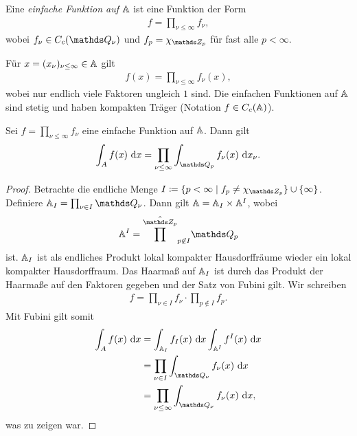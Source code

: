 \begin{defi}
Eine \emph{einfache Funktion auf $\mathbb{A}$} ist eine Funktion der Form
\begin{align*}
f=\prod_{\nu \leq \infty} f_\nu,
\end{align*}
wobei $f_\nu \in C_c(\Q_\nu)$ und $f_p=\chi_{\Z_p}$ für fast alle $p<\infty$.
\end{defi}

\begin{bem}
Für $x=(x_\nu)_{\nu \leq \infty}\in \mathbb{A}$ gilt
\begin{align*}
f(x)=\prod_{\nu \leq \infty} f_\nu(x),
\end{align*}
wobei nur endlich viele Faktoren ungleich $1$ sind.
Die einfachen Funktionen auf $\mathbb{A}$ sind stetig und haben kompakten Träger (Notation $f \in C_c(\mathbb{A})$).
\end{bem}

\begin{prop}
Sei $f=\prod_{\nu \leq \infty} f_\nu$ eine einfache Funktion auf $\mathbb{A}$.
Dann gilt
\begin{align*}
\int_A f(x)~\mathrm{d}x=\prod_{\nu \leq \infty} \int_{\Q_p} f_\nu(x)~\mathrm{d}x_\nu.
\end{align*}
\end{prop}

\begin{proof}
Betrachte die endliche Menge $I \coloneqq \{p <\infty \mid f_p \not = \chi_{\Z_p}\} \cup \{\infty\}$.
Definiere $\A_I=\prod_{\nu \in I}\Q_\nu$.
Dann gilt $\mathbb{A}=\mathbb{A}_I \times \mathbb{A}^I$, wobei
\begin{align*}
\A^I =\hat{\prod^{\Z_p}}_{p \not \in I} \Q_p
\end{align*}
ist.
$\mathbb{A}_I$ ist als endliches Produkt lokal kompakter Hausdorffräume wieder ein lokal kompakter Hausdorffraum.
Das Haarmaß auf $\mathbb{A}_I$ ist durch das Produkt der Haarmaße auf den Faktoren gegeben und der Satz von Fubini gilt.
Wir schreiben
\begin{align*}
f=\prod_{\nu \in I} f_\nu \cdot \prod_{p \not \in I} f_p.
\end{align*}
Mit Fubini gilt somit
\begin{align*}
\int_Af(x)~\mathrm{d}x&=\int_{\A_I}f_I(x)~\mathrm{d}x \int_{\A^I}f^I(x)~\mathrm{d}x\\
&=\prod_{\nu \in I} \int_{\Q_\nu} f_\nu(x)~\mathrm{d}x\\
&=\prod_{\nu \leq \infty} \int_{\Q_\nu} f_\nu(x)~\mathrm{d}x,
\end{align*}
was zu zeigen war.
\end{proof}


